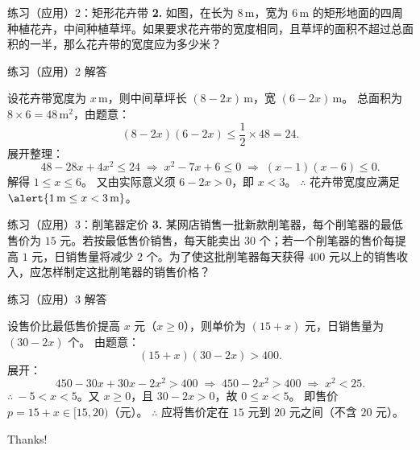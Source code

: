 \documentclass[10pt,aspectratio=169,serif]{beamer}
\begin{document}
\begin{frame}[t]{练习（应用）2：矩形花卉带}
\textbf{2.} 如图，在长为 $8\,\text{m}$，宽为 $6\,\text{m}$ 的矩形地面的四周种植花卉，中间种植草坪。如果要求花卉带的宽度相同，且草坪的面积不超过总面积的一半，那么花卉带的宽度应为多少米？

\vspace{1em}
\begin{center}
\end{center}
\end{frame}

\begin{frame}[t]{练习（应用）2 解答}
\begin{tcolorbox}[colback=orange!10,colframe=orange,title=\textbf{解}]
设花卉带宽度为 $x\,\text{m}$，则中间草坪长 $(8-2x)\,\text{m}$，宽 $(6-2x)\,\text{m}$。
总面积为 $8\times 6=48\,\text{m}^{2}$，由题意：
\[
(8-2x)(6-2x)\le \frac{1}{2}\times 48=24.
\]
展开整理：
\[
48-28x+4x^{2}\le 24
\;\Longrightarrow\;
x^{2}-7x+6\le 0
\;\Longrightarrow\;
(x-1)(x-6)\le 0.
\]
解得 $1\le x\le 6$。
又由实际意义须 $6-2x>0$，即 $x<3$。
\vspace{0.5em}
$\therefore$ 花卉带宽度应满足 $\alert{1\,\text{m}\le x<3\,\text{m}}$。
\end{tcolorbox}
\end{frame}

\begin{frame}[t]{练习（应用）3：削笔器定价}
\textbf{3.} 某网店销售一批新款削笔器，每个削笔器的最低售价为 $15$ 元。若按最低售价销售，每天能卖出 $30$ 个；若一个削笔器的售价每提高 $1$ 元，日销售量将减少 $2$ 个。为了使这批削笔器每天获得 $400$ 元以上的销售收入，应怎样制定这批削笔器的销售价格？
\end{frame}

\begin{frame}[t]{练习（应用）3 解答}
\begin{tcolorbox}[colback=orange!10,colframe=orange,title=\textbf{解}]
设售价比最低售价提高 $x$ 元（$x\ge 0$），则单价为 $(15+x)$ 元，日销售量为 $(30-2x)$ 个。
由题意：
\[
(15+x)(30-2x)>400.
\]
展开：
\[
450-30x+30x-2x^{2}>400
\;\Longrightarrow\;
450-2x^{2}>400
\;\Longrightarrow\;
x^{2}<25.
\]
$\therefore\ -5<x<5$。又 $x\ge 0$，且 $30-2x>0$，故 $0\le x<5$。
\vspace{0.5em}
即售价 $p=15+x\in [15,20)$（元）。
$\therefore$ 应将售价定在 \alert{$15$ 元到 $20$ 元之间（不含 $20$ 元）}。
\end{tcolorbox}
\end{frame}

\begin{frame}[c]
  \begin{center}
    {\Huge\calligra Thanks!}
  \end{center}
\end{frame}
\end{document}
